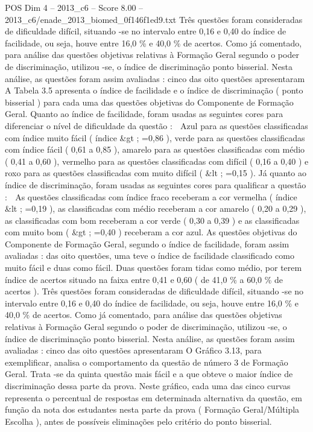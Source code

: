 \begin{textsample}{POS Dim 4 – 2013\_c6 – Score 8.00 – 2013\_c6/enade\_2013\_biomed\_0f146f1ed9.txt}
Três questões foram consideradas de dificuldade difícil, situando -se no intervalo entre 0,16 e 0,40 do índice de facilidade, ou seja, houve entre 16,0 \% e 40,0 \% de acertos.
Como já comentado, para análise das questões objetivas relativas à Formação Geral segundo o poder de discriminação, utilizou -se, o índice de discriminação ponto bisserial.
Nesta análise, as questões foram assim avaliadas : cinco das oito questões apresentaram A Tabela 3.5 apresenta o índice de facilidade e o índice de discriminação ( ponto bisserial ) para cada uma das questões objetivas do Componente de Formação Geral.
Quanto ao índice de facilidade, foram usadas as seguintes cores para diferenciar o nível de dificuldade da questão :  Azul para as questões classificadas com índice muito fácil ( índice \&gt ; =0,86 ), verde para as questões classificadas com índice fácil ( 0,61 a 0,85 ), amarelo para as questões classificadas com médio ( 0,41 a 0,60 ), vermelho para as questões classificadas com difícil ( 0,16 a 0,40 ) e roxo para as questões classificadas com muito difícil ( \&lt ; =0,15 ).
Já quanto ao índice de discriminação, foram usadas as seguintes cores para qualificar a questão :  As questões classificadas com índice fraco receberam a cor vermelha ( índice \&lt ; =0,19 ), as classificadas com médio receberam a cor amarelo ( 0,20 a 0,29 ), as classificadas com bom receberam a cor verde ( 0,30 a 0,39 ) e as classificadas com muito bom ( \&gt ; =0,40 ) receberam a cor azul.
As questões objetivas do Componente de Formação Geral, segundo o índice de facilidade, foram assim avaliadas : das oito questões, uma teve o índice de facilidade classificado como muito fácil e duas como fácil.
Duas questões foram tidas como médio, por terem índice de acertos situado na faixa entre 0,41 e 0,60 ( de 41,0 \% a 60,0 \% de acertos ).
Três questões foram consideradas de dificuldade difícil, situando -se no intervalo entre 0,16 e 0,40 do índice de facilidade, ou seja, houve entre 16,0 \% e 40,0 \% de acertos.
Como já comentado, para análise das questões objetivas relativas à Formação Geral segundo o poder de discriminação, utilizou -se, o índice de discriminação ponto bisserial.
Nesta análise, as questões foram assim avaliadas : cinco das oito questões apresentaram O Gráfico 3.13, para exemplificar, analisa o comportamento da questão de número 3 de Formação Geral.
Trata -se da quinta questão mais fácil e a que obteve o maior índice de discriminação dessa parte da prova.
Neste gráfico, cada uma das cinco curvas representa o percentual de respostas em determinada alternativa da questão, em função da nota dos estudantes nesta parte da prova ( Formação Geral/Múltipla Escolha ), antes de possíveis eliminações pelo critério do ponto bisserial.

\end{textsample}
